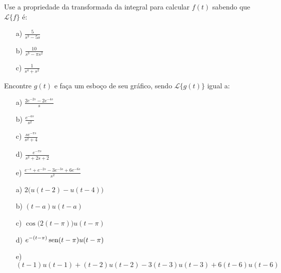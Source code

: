 \begin{Exercise}
Use a propriedade da transformada da integral para calcular $f(t)$ sabendo que $\mathcal{L}\{f \} $ é:

\begin{itemize}
  \item[a)] $\displaystyle \frac{5}{s^3 - 5s}$
  \item[b)] $\displaystyle \frac{10}{s^3 - \pi s^2}$
  \item[c)] $\displaystyle \frac{1}{s^4 + s^2}$
\end{itemize}

\end{Exercise}
\begin{Exercise}
Encontre $g(t)$ e faça um esboço de seu gráfico, sendo $\mathcal{L}\{ g(t)\}$ igual a:

\begin{itemize}
  \item[a)] $\displaystyle \frac{2e^{-2s} - 2 e^{-4s}}{s}$
  \item[b)] $\displaystyle \frac{e^{-as}}{s^2}$
  \item[c)] $\displaystyle \frac{se^{-\pi s}}{s^2+4}$
  \item[d)] $\displaystyle \frac{e^{-\pi s}}{s^2 + 2s +2}$
  \item[e)] $\displaystyle \frac{e^{-s}+ e^{-2s} -3 e^{-3s} +6 e^{-6s}}{s^2}$
\end{itemize}

\end{Exercise}
\begin{Answer}
 
\begin{itemize}

\item[a)] $\displaystyle 2 \big( u(t-2) - u(t-4) \big)$
  \item[b)] $\displaystyle (t-a)u(t-a)$
  \item[c)] $\displaystyle \cos\big(2(t-\pi)\big)u(t-\pi)$
  \item[d)] $\displaystyle e^{-(t-\pi)} \operatorname{sen}(t-\pi)u(t-\pi)$
  \item[e)] $\displaystyle (t-1)u(t-1) + (t-2)u(t-2) -3(t-3)u(t-3) + 6(t-6)u(t-6)$
\end{itemize}

\end{Answer}

%